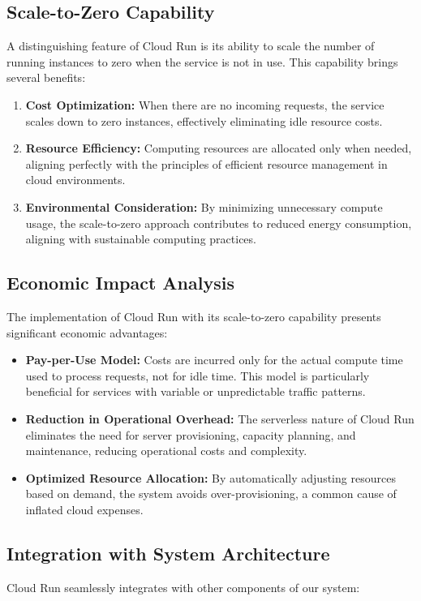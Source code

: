 \documentclass[a4paper, 12pt]{report}
\begin{document}
\subsection{Scale-to-Zero Capability}
A distinguishing feature of Cloud Run is its ability to scale the number of running instances to zero when the service is not in use. This capability brings several benefits:

\begin{enumerate}
    \item \textbf{Cost Optimization:} When there are no incoming requests, the service scales down to zero instances, effectively eliminating idle resource costs.
    \item \textbf{Resource Efficiency:} Computing resources are allocated only when needed, aligning perfectly with the principles of efficient resource management in cloud environments.
    \item \textbf{Environmental Consideration:} By minimizing unnecessary compute usage, the scale-to-zero approach contributes to reduced energy consumption, aligning with sustainable computing practices.
\end{enumerate}

\subsection{Economic Impact Analysis}
The implementation of Cloud Run with its scale-to-zero capability presents significant economic advantages:

\begin{itemize}
    \item \textbf{Pay-per-Use Model:} Costs are incurred only for the actual compute time used to process requests, not for idle time. This model is particularly beneficial for services with variable or unpredictable traffic patterns.
    \item \textbf{Reduction in Operational Overhead:} The serverless nature of Cloud Run eliminates the need for server provisioning, capacity planning, and maintenance, reducing operational costs and complexity.
    \item \textbf{Optimized Resource Allocation:} By automatically adjusting resources based on demand, the system avoids over-provisioning, a common cause of inflated cloud expenses.
\end{itemize}

\subsection{Integration with System Architecture}
Cloud Run seamlessly integrates with other components of our system:
\end{document}
